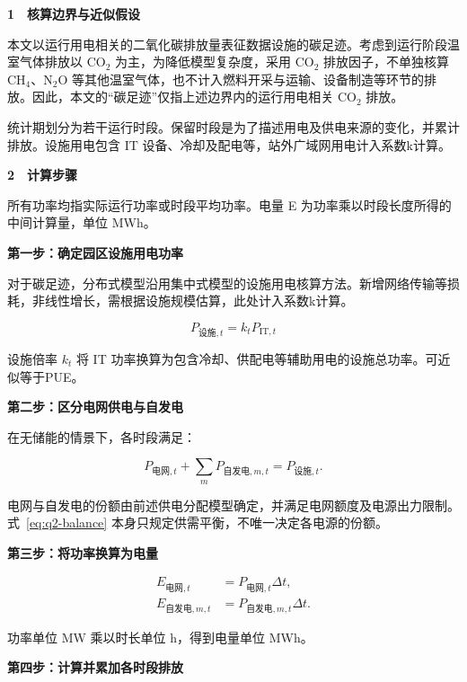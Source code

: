 
\textbf{1　核算边界与近似假设}

本文以运行用电相关的二氧化碳排放量表征数据设施的碳足迹。考虑到运行阶段温室气体排放以 CO$_2$ 为主，为降低模型复杂度，采用 CO$_2$ 排放因子，不单独核算 CH$_4$、N$_2$O 等其他温室气体，也不计入燃料开采与运输、设备制造等环节的排放。因此，本文的“碳足迹”仅指上述边界内的运行用电相关 CO$_2$ 排放。

统计期划分为若干运行时段。保留时段是为了描述用电及供电来源的变化，并累计排放。设施用电包含 IT 设备、冷却及配电等，站外广域网用电计入系数k计算。

\textbf{2　计算步骤}

所有功率均指实际运行功率或时段平均功率。电量 E 为功率乘以时段长度所得的中间计算量，单位 MWh。

\textbf{第一步：确定园区设施用电功率}

对于碳足迹，分布式模型沿用集中式模型的设施用电核算方法。新增网络传输等损耗，非线性增长，需根据设施规模估算，此处计入系数k计算。

\begin{equation}\label{eq:q2-facility}
P_{\text{设施},t}=k_tP_{\mathrm{IT},t}
\end{equation}

设施倍率 $k_t$ 将 IT 功率换算为包含冷却、供配电等辅助用电的设施总功率。可近似等于PUE。

\textbf{第二步：区分电网供电与自发电}

在无储能的情景下，各时段满足：

\begin{equation}\label{eq:q2-balance}
P_{\text{电网},t}
+\sum_mP_{\text{自发电},m,t}
=P_{\text{设施},t}.
\end{equation}

电网与自发电的份额由前述供电分配模型确定，并满足电网额度及电源出力限制。式~\eqref{eq:q2-balance} 本身只规定供需平衡，不唯一决定各电源的份额。

\textbf{第三步：将功率换算为电量}

\begin{equation}\label{eq:q2-energy}
\begin{aligned}
E_{\text{电网},t} &= P_{\text{电网},t}\Delta t,\\
E_{\text{自发电},m,t} &= P_{\text{自发电},m,t}\Delta t.
\end{aligned}
\end{equation}

功率单位 MW 乘以时长单位 h，得到电量单位 MWh。

\textbf{第四步：计算并累加各时段排放}

